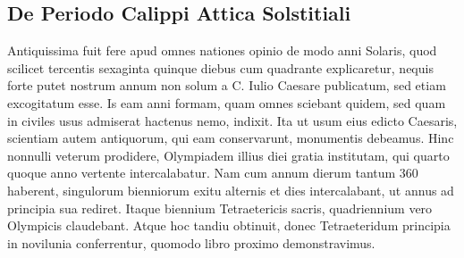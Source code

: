 \subsection{De Periodo Calippi Attica Solstitiali}
Antiquissima fuit fere apud omnes nationes opinio de modo
anni Solaris, quod scilicet tercentis sexaginta quinque diebus
cum quadrante explicaretur, nequis forte putet nostrum annum
non solum a C. %
 Iulio Caesare publicatum, sed etiam excogitatum esse.
Is eam anni formam, quam omnes sciebant quidem, sed quam in civiles
usus admiserat hactenus nemo, indixit.
Ita ut usum eius edicto Caesaris,
scientiam autem antiquorum, qui eam conservarunt, monumentis
debeamus.
Hinc nonnulli veterum prodidere, Olympiadem illius
diei gratia institutam, qui quarto quoque anno vertente intercalabatur.
Nam cum annum dierum tantum 360 haberent, singulorum bienniorum
exitu alternis  et  dies intercalabant, ut annus ad principia
sua rediret.
Itaque biennium Tetraetericis sacris, quadriennium vero
Olympicis claudebant.
Atque hoc tandiu obtinuit, donec Tetraeteridum
principia in novilunia conferrentur, quomodo libro proximo
demonstravimus.

